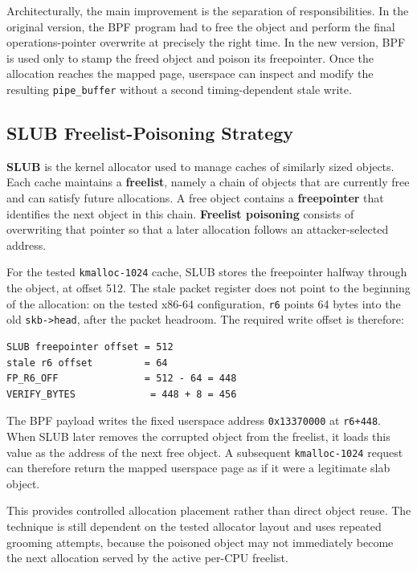 \documentclass[../main.tex]{subfiles}
\begin{document}
Architecturally, the main improvement is the separation of responsibilities. In the original version, the BPF program had to free the object and perform the final operations-pointer overwrite at precisely the right time. In the new version, BPF is used only to stamp the freed object and poison its freepointer. Once the allocation reaches the mapped page, userspace can inspect and modify the resulting \texttt{pipe\_buffer} without a second timing-dependent stale write.

\subsection{SLUB Freelist-Poisoning Strategy}

\textbf{SLUB} is the kernel allocator used to manage caches of similarly sized objects. Each cache maintains a \textbf{freelist}, namely a chain of objects that are currently free and can satisfy future allocations. A free object contains a \textbf{freepointer} that identifies the next object in this chain. \textbf{Freelist poisoning} consists of overwriting that pointer so that a later allocation follows an attacker-selected address.

For the tested \texttt{kmalloc-1024} cache, SLUB stores the freepointer halfway through the object, at offset 512. The stale packet register does not point to the beginning of the allocation: on the tested x86-64 configuration, \texttt{r6} points 64 bytes into the old \texttt{skb->head}, after the packet headroom. The required write offset is therefore:

\begin{lstlisting}[caption={Freepointer offset relative to the stale packet pointer.}]
SLUB freepointer offset = 512
stale r6 offset         = 64
FP_R6_OFF               = 512 - 64 = 448
VERIFY_BYTES             = 448 + 8 = 456
\end{lstlisting}

The BPF payload writes the fixed userspace address \texttt{0x13370000} at \texttt{r6+448}. When SLUB later removes the corrupted object from the freelist, it loads this value as the address of the next free object. A subsequent \texttt{kmalloc-1024} request can therefore return the mapped userspace page as if it were a legitimate slab object.

This provides controlled allocation placement rather than direct object reuse. The technique is still dependent on the tested allocator layout and uses repeated grooming attempts, because the poisoned object may not immediately become the next allocation served by the active per-CPU freelist.
\end{document}
